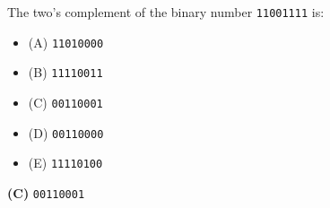 

The two's complement of the binary number {\tt 11001111} is:

\begin{itemize}
\item{(A)} {\tt 11010000}
\vskip 5pt 
\item{(B)} {\tt 11110011}
\vskip 5pt 
\item{(C)} {\tt 00110001}
\vskip 5pt 
\item{(D)} {\tt 00110000}
\vskip 5pt 
\item{(E)} {\tt 11110100}
\end{itemize}







{\bf (C)} {\tt 00110001}
 










